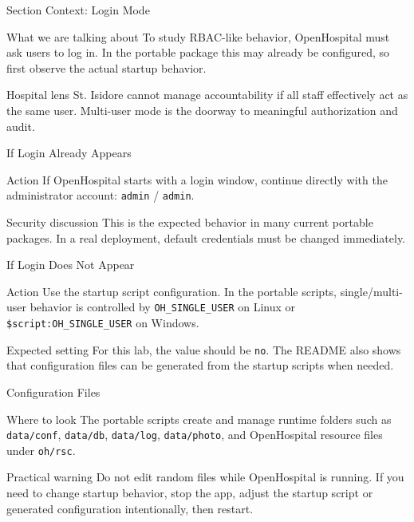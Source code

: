 \documentclass[presentation]{beamer}
\begin{document}
\begin{frame}[c]{Section Context: Login Mode}
\begin{block}{What we are talking about}
To study RBAC-like behavior, OpenHospital must ask users to log in. In the portable package this
may already be configured, so first observe the actual startup behavior.
\end{block}

\begin{exampleblock}{Hospital lens}
St. Isidore cannot manage accountability if all staff effectively act as the same user. Multi-user
mode is the doorway to meaningful authorization and audit.
\end{exampleblock}
\end{frame}

\begin{frame}[c]{If Login Already Appears}
\begin{block}{Action}
If OpenHospital starts with a login window, continue directly with the administrator account:
\texttt{admin} / \texttt{admin}.
\end{block}

\begin{exampleblock}{Security discussion}
This is the expected behavior in many current portable packages. In a real deployment, default
credentials must be changed immediately.
\end{exampleblock}
\end{frame}

\begin{frame}[c]{If Login Does Not Appear}
\begin{block}{Action}
Use the startup script configuration. In the portable scripts, single/multi-user behavior is
controlled by \texttt{OH\_SINGLE\_USER} on Linux or
\texttt{\$script:OH\_SINGLE\_USER} on Windows.
\end{block}

\begin{exampleblock}{Expected setting}
For this lab, the value should be \texttt{no}. The README also shows that configuration files can be
generated from the startup scripts when needed.
\end{exampleblock}
\end{frame}

\begin{frame}[c]{Configuration Files}
\begin{block}{Where to look}
The portable scripts create and manage runtime folders such as \texttt{data/conf},
\texttt{data/db}, \texttt{data/log}, \texttt{data/photo}, and OpenHospital resource files under
\texttt{oh/rsc}.
\end{block}

\begin{exampleblock}{Practical warning}
Do not edit random files while OpenHospital is running. If you need to change startup behavior, stop
the app, adjust the startup script or generated configuration intentionally, then restart.
\end{exampleblock}
\end{frame}
\end{document}
